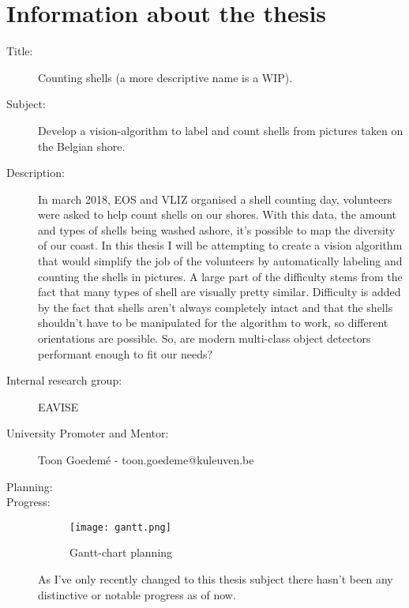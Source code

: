 
\chapter{Information about the thesis}

\begin{description}
   \item[Title:] Counting shells (a more descriptive name is a WIP).
   \item[Subject: ] Develop a vision-algorithm to label and count shells from pictures taken on the Belgian shore.
   \item[Description: ] In march 2018, EOS and VLIZ organised a shell counting day, volunteers were asked to help count shells on our shores. With this data, the amount and types of shells being washed ashore, it's possible to map the diversity of our coast. In this thesis I will be attempting to create a vision algorithm that would simplify the job of the volunteers by automatically labeling and counting the shells in pictures. A large part of the difficulty stems from the fact that many types of shell are visually pretty similar. Difficulty is added by the fact that shells aren't always completely intact and that the shells shouldn't have to be manipulated for the algorithm to work, so different orientations are possible. So, are modern multi-class object detectors performant enough to fit our needs?
   \item[Internal research group: ] EAVISE
   \item[University Promoter and Mentor: ] Toon Goedemé - toon.goedeme@kuleuven.be
   \newpage
   \item[Planning: ] 
   \item[Progress: ] 
   \begin{figure}[h]
 	\centering
 	\texttt{[image: gantt.png]}
 	\caption{Gantt-chart planning}
   \end{figure}
   As I've only recently changed to this thesis subject there hasn't been any distinctive or notable progress as of now.
   
    
\end{description}


 